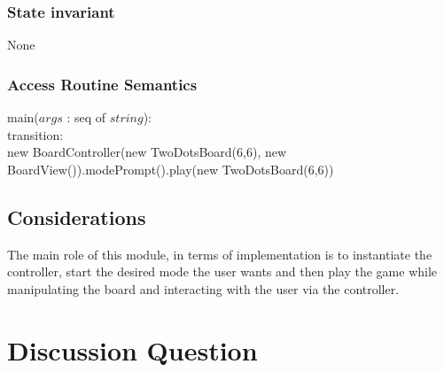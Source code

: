 \documentclass[12pt]{article}
\begin{document}
\subsubsection*{State invariant}
\noindent None

\subsubsection* {Access Routine Semantics}

\noindent main($args$ : seq of $string$):\\
\noindent transition:\\
new BoardController(new TwoDotsBoard(6,6), new BoardView()).modePrompt().play(new TwoDotsBoard(6,6))

\subsection*{Considerations}
The main role of this module, in terms of implementation is to instantiate the controller, start the desired mode the user wants and then play the game while manipulating the board and interacting with the user via the controller.

\newpage

\section*{Discussion Question}
\end{document}
